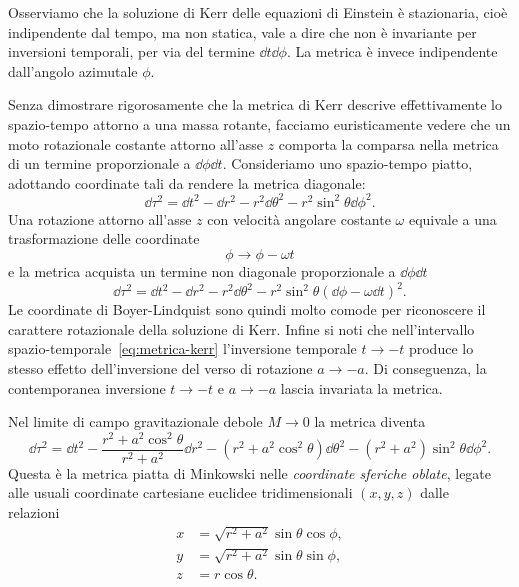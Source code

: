 Osserviamo che la soluzione di Kerr delle equazioni di Einstein è stazionaria,
cioè indipendente dal tempo, ma non statica, vale a dire che non è invariante
per inversioni temporali, per via del termine \(\dd t\dd\phi\).  La metrica è
invece indipendente dall'angolo azimutale \(\phi\).

Senza dimostrare rigorosamente che la metrica di Kerr descrive effettivamente lo
spazio-tempo attorno a una massa rotante, facciamo euristicamente vedere che un
moto rotazionale costante attorno all'asse \(z\) comporta la comparsa nella
metrica di un termine proporzionale a \(\dd\phi\dd t\).  Consideriamo uno
spazio-tempo piatto, adottando coordinate tali da rendere la metrica diagonale:
\begin{equation}
  \dd\tau^{2} = \dd t^{2} - \dd r^{2} - r^{2}\dd\theta^{2} -
  r^{2}\sin^{2}\theta\dd \phi^{2}.
\end{equation}
Una rotazione attorno all'asse \(z\) con velocità angolare costante \(\omega\)
equivale a una trasformazione delle coordinate
\begin{equation}
  \phi \to \phi - \omega t
\end{equation}
e la metrica acquista un termine non diagonale proporzionale a \(\dd\phi\dd t\)
\begin{equation}
  \dd\tau^{2} = \dd t^{2} - \dd r^{2} - r^{2}\dd\theta^{2} -
  r^{2}\sin^{2}\theta(\dd \phi - \omega\dd t)^{2}.
\end{equation}
Le coordinate di Boyer-Lindquist sono quindi molto comode per riconoscere il
carattere rotazionale della soluzione di Kerr.  Infine si noti che
nell'intervallo spazio-temporale~\eqref{eq:metrica-kerr} l'inversione temporale
\(t\to -t\) produce lo stesso effetto dell'inversione del verso di rotazione
\(a\to -a\).  Di conseguenza, la contemporanea inversione \(t\to -t\) e \(a\to
-a\) lascia invariata la metrica.

Nel limite di campo gravitazionale debole \(M\to 0\) la metrica diventa
\begin{equation}
  \dd\tau^{2} = \dd t^{2} - \frac{r^{2} + a^{2}\cos^{2}\theta}{r^{2} + a^{2}}\dd
  r^{2} - (r^{2} + a^{2}\cos^{2}\theta)\dd\theta^{2} - (r^{2} +
  a^{2})\sin^{2}\theta\dd\phi^{2}.
\end{equation}
Questa è la metrica piatta di Minkowski nelle 
\emph{coordinate sferiche oblate}, legate alle usuali coordinate cartesiane
euclidee tridimensionali \((x, y, z)\) dalle
relazioni~\parencite{2007arXiv0706.0622V}
\begin{subequations}
  \label{eq:boyer-lindquist-debole}
  \begin{align}
    x &= \sqrt{r^{2} + a^{2}}\sin\theta\cos\phi, \\
    y &= \sqrt{r^{2} + a^{2}}\sin\theta\sin\phi, \\
    z &= r\cos\theta.
  \end{align}
\end{subequations}

